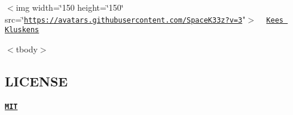 \tabulinesep=1mm
\begin{longtabu} spread 0pt [c]{*{0}{|X[-1]}|}
\hline
\end{longtabu}


$<$img width=\char`\"{}150 height=\char`\"{}150\char`\"{}
        src=\char`\"{}\href{https://avatars.githubusercontent.com/SpaceK33z?v=3}{\tt https\+://avatars.\+githubusercontent.\+com/\+Space\+K33z?v=3}"$>$ ~\newline
 \href{https://github.com/SpaceK33z}{\tt Kees Kluskens}  

$<$tbody$>$ 

\subsection*{L\+I\+C\+E\+N\+SE}

\paragraph*{\href{./LICENSE}{\tt M\+IT}}